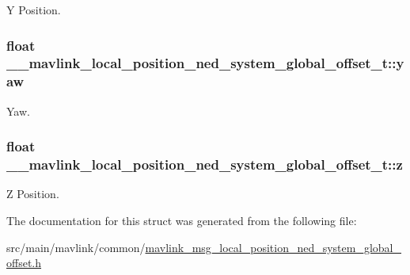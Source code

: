 Y Position. 

\hypertarget{struct____mavlink__local__position__ned__system__global__offset__t_a2a919917ced7545167d6f588d6c8f0ef}{
\subsubsection[{yaw}]{\setlength{\rightskip}{0pt plus 5cm}float \+\_\+\+\_\+mavlink\+\_\+local\+\_\+position\+\_\+ned\+\_\+system\+\_\+global\+\_\+offset\+\_\+t\+::yaw}}\label{struct____mavlink__local__position__ned__system__global__offset__t_a2a919917ced7545167d6f588d6c8f0ef}


Yaw. 

\hypertarget{struct____mavlink__local__position__ned__system__global__offset__t_a39ca4444559388d75cb066b14db24a4b}{
\subsubsection[{z}]{\setlength{\rightskip}{0pt plus 5cm}float \+\_\+\+\_\+mavlink\+\_\+local\+\_\+position\+\_\+ned\+\_\+system\+\_\+global\+\_\+offset\+\_\+t\+::z}}\label{struct____mavlink__local__position__ned__system__global__offset__t_a39ca4444559388d75cb066b14db24a4b}


Z Position. 



The documentation for this struct was generated from the following file\+:\begin{DoxyCompactItemize}
\item 
src/main/mavlink/common/\hyperlink{mavlink__msg__local__position__ned__system__global__offset_8h}{mavlink\+\_\+msg\+\_\+local\+\_\+position\+\_\+ned\+\_\+system\+\_\+global\+\_\+offset.\+h}\end{DoxyCompactItemize}
